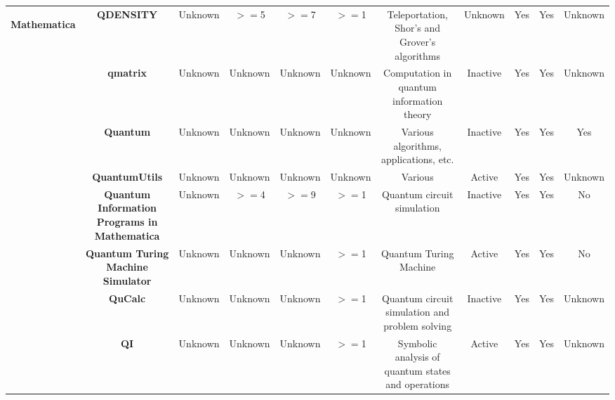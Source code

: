 \documentclass[conference]{IEEEtran}
\begin{document}
\begin{table*}[h!]
{\begin{tabular}{c|c|c|c|c|c|c|c|c|c|c}
    \multirow{8}{*}{\begin{sideways}\textbf{Mathematica}\end{sideways}} & \textbf{QDENSITY } & Unknown &$>=$5  &$>=$7  &$>=$1  & Teleportation, Shor's and Grover's algorithms & Unknown & Yes   & Yes   & Unknown \\
               & \textbf{qmatrix } & Unknown & Unknown & Unknown & Unknown & Computation in quantum information theory & Inactive & Yes   & Yes   & Unknown \\
               & \textbf{Quantum } & Unknown & Unknown & Unknown & Unknown & Various algorithms, applications, etc. & Inactive & Yes   & Yes   & Yes \\
               & \textbf{QuantumUtils } & Unknown & Unknown & Unknown & Unknown & Various & Active & Yes   & Yes   & Unknown \\
               & \textbf{Quantum Information Programs in Mathematica } & Unknown &$>=$4  &$>=$9  &$>=$1  & Quantum circuit simulation & Inactive & Yes   & Yes   & No \\
               & \textbf{Quantum Turing Machine Simulator } & Unknown & Unknown & Unknown &$>=$1  & Quantum Turing Machine & Active & Yes   & Yes   & No \\
               & \textbf{QuCalc } & Unknown & Unknown & Unknown &$>=$1  & Quantum circuit simulation and problem solving & Inactive & Yes   & Yes   & Unknown \\
               & \textbf{QI } & Unknown & Unknown & Unknown &$>=$1  & Symbolic analysis of quantum states and operations & Active & Yes   & Yes   & Unknown \\
    \hline



\end{tabular}}
\end{table*}
\end{document}

